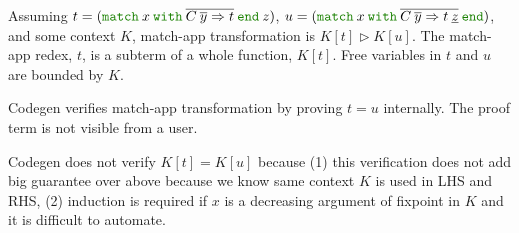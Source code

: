 \documentclass[a4paper,fleqn]{article}
\def\codegen{\textrm{Codegen}}
\newcommand{\kwmatch}{\mbox{\color{mygreen}\ttfamily match}}
\newcommand{\kwwith}{\mbox{\color{mygreen}\ttfamily with}}
\newcommand{\kwend}{\mbox{\color{mygreen}\ttfamily end}}
\newcommand{\omatch}[2]{\kwmatch\:#1\:\kwwith\:{#2}\:\kwend}
\newcommand{\reltri}{\mathrel{\triangleright}}
\newcommand{\rep}[1]{\overline{#1}}
\begin{document}
Assuming $t = (\omatch{x}{\rep{C\: \rep{y}\Rightarrow t}}\: z)$,
$u = (\omatch{x}{\rep{C\: \rep{y} \Rightarrow t\: \underline{z}}})$, and
some context $K$,
match-app transformation is $K[t] \reltri K[u]$.
The match-app redex, $t$, is a subterm of a whole function, $K[t]$.
Free variables in $t$ and $u$ are bounded by $K$.

\codegen{} verifies match-app transformation by proving $t = u$ internally.
The proof term is not visible from a user.

\codegen{} does not verify $K[t] = K[u]$ because
(1) this verification does not add big guarantee over above because we know same context $K$ is used in LHS and RHS,
(2) induction is required if $x$ is a decreasing argument of fixpoint in $K$ and it is difficult to automate.





\end{document}
